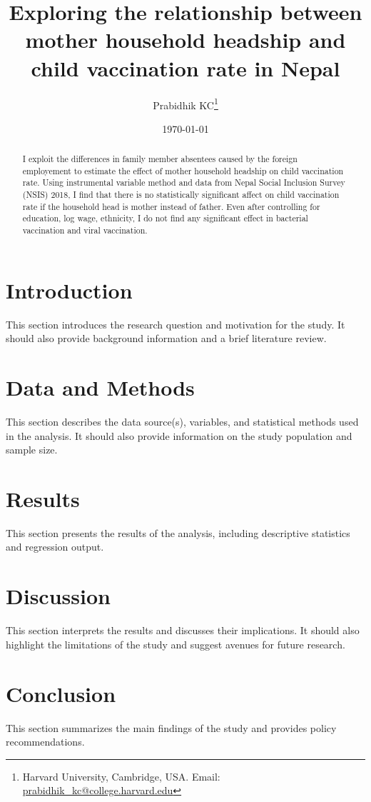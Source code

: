 \documentclass[12pt]{article}
\title{Exploring the relationship between mother household headship and child vaccination rate in Nepal
}
\author{Prabidhik KC\thanks{Harvard University, Cambridge, USA. Email: \href{mailto:prabidhik_kc@college.harvard.edu}{prabidhik_kc@college.harvard.edu}}}
\date{\today}
\begin{document}
\maketitle

\begin{abstract}
I exploit the differences in family member absentees caused by the foreign employement to estimate the effect of mother household headship on child vaccination rate. Using instrumental variable method and data from Nepal Social Inclusion Survey (NSIS) 2018, I find that there is no statistically significant affect on child vaccination rate if the household head is mother instead of father. Even after controlling for education, log wage, ethnicity, I do not find any significant effect in bacterial vaccination and viral vaccination.
\end{abstract}

\section{Introduction}
This section introduces the research question and motivation for the study. It should also provide background information and a brief literature review.

\section{Data and Methods}
This section describes the data source(s), variables, and statistical methods used in the analysis. It should also provide information on the study population and sample size.

\section{Results}
This section presents the results of the analysis, including descriptive statistics and regression output.

\section{Discussion}
This section interprets the results and discusses their implications. It should also highlight the limitations of the study and suggest avenues for future research.

\section{Conclusion}
This section summarizes the main findings of the study and provides policy recommendations.



\end{document}
